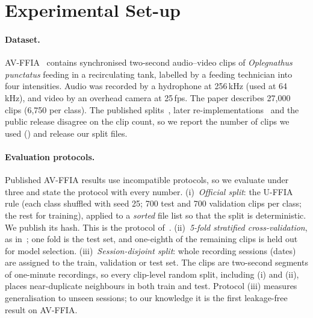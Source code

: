 \section{Experimental Set-up}
\label{sec:setup}

\paragraph{Dataset.} AV-FFIA~\cite{cui2024uffia} contains synchronised two-second audio--video clips of
\textit{Oplegnathus punctatus} feeding in a recirculating tank, labelled by a feeding technician into
four intensities. Audio was recorded by a hydrophone at 256\,kHz (used at 64\,kHz), and video by an
overhead camera at 25\,fps. The paper describes 27,000 clips (6,750 per class). The published
splits~\cite{cui2024uffia}, later re-implementations~\cite{dynagate2026,hmmfnet2026} and the public
release disagree on the clip count, so we report the number of clips we used () and
release our split files.

\paragraph{Evaluation protocols.} Published AV-FFIA results use incompatible protocols, so we
evaluate under three and state the protocol with every number.
(i)~\emph{Official split}: the U-FFIA rule (each class shuffled with seed 25; 700 test and 700
validation clips per class; the rest for training), applied to a \emph{sorted} file list so that the
split is deterministic. We publish its hash. This is the protocol of~\cite{cui2024uffia,dynagate2026}.
(ii)~\emph{5-fold stratified cross-validation}, as in~\cite{hmmfnet2026}; one fold is the test set, and
one-eighth of the remaining clips is held out for model selection.
(iii)~\emph{Session-disjoint split}: whole recording sessions (dates) are assigned to the train,
validation or test set. The clips are two-second segments of one-minute recordings, so every
clip-level random split, including (i) and (ii), places near-duplicate neighbours in both train and
test. Protocol (iii) measures generalisation to unseen sessions; to our knowledge it is the first
leakage-free result on AV-FFIA.

